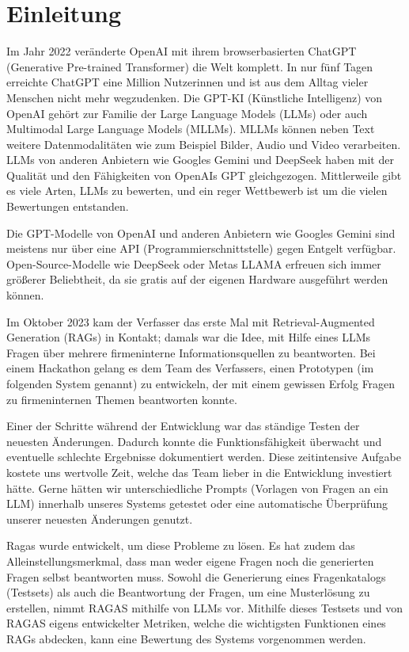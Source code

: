 \chapter{Einleitung}

Im Jahr 2022 veränderte OpenAI mit ihrem browserbasierten ChatGPT (Generative Pre-trained Transformer) \cite{openai_chatgpt_2022} die Welt komplett. In nur fünf Tagen erreichte ChatGPT eine Million Nutzer\*innen \cite{doit_software_chatgpt_2025} und ist aus dem Alltag vieler Menschen nicht mehr wegzudenken.
Die GPT-KI (Künstliche Intelligenz) von OpenAI gehört zur Familie der Large Language Models (LLMs) oder auch Multimodal Large Language Models (MLLMs). MLLMs können neben Text weitere Datenmodalitäten wie zum Beispiel Bilder, Audio und Video verarbeiten.
LLMs von anderen Anbietern wie Googles Gemini \cite{gemini_team_2023} und DeepSeek \cite{deepseek_team_2024} haben mit der Qualität und den Fähigkeiten von OpenAIs GPT gleichgezogen. Mittlerweile gibt es viele Arten, LLMs zu bewerten, und ein reger Wettbewerb ist um die vielen Bewertungen entstanden.

Die GPT-Modelle von OpenAI und anderen Anbietern wie Googles Gemini \cite{gemini_team_2024} sind meistens nur über eine API (Programmierschnittstelle) gegen Entgelt verfügbar.
Open-Source-Modelle wie DeepSeek \cite{deepseek_team_2024} oder Metas LLAMA \cite{touvron_2023} erfreuen sich immer größerer Beliebtheit, da sie gratis auf der eigenen Hardware ausgeführt werden können.

Im Oktober 2023 kam der Verfasser das erste Mal mit Retrieval-Augmented Generation (RAGs) in Kontakt; damals war die Idee, mit Hilfe eines LLMs Fragen über mehrere firmeninterne Informationsquellen zu beantworten.
Bei einem Hackathon gelang es dem Team des Verfassers, einen Prototypen (im folgenden System genannt) zu entwickeln, der mit einem gewissen Erfolg Fragen zu firmeninternen Themen beantworten konnte.

Einer der Schritte während der Entwicklung war das ständige Testen der neuesten Änderungen. Dadurch konnte die Funktionsfähigkeit überwacht und eventuelle schlechte Ergebnisse dokumentiert werden.
Diese zeitintensive Aufgabe kostete uns wertvolle Zeit, welche das Team lieber in die Entwicklung investiert hätte.
Gerne hätten wir unterschiedliche Prompts (Vorlagen von Fragen an ein LLM) innerhalb unseres Systems getestet oder eine automatische Überprüfung unserer neuesten Änderungen genutzt.

Ragas \cite{es_ragas_2024} wurde entwickelt, um diese Probleme zu lösen. Es hat zudem das Alleinstellungsmerkmal, dass man weder eigene Fragen noch die generierten Fragen selbst beantworten muss.
Sowohl die Generierung eines Fragenkatalogs (Testsets) als auch die Beantwortung der Fragen, um eine Musterlösung zu erstellen, nimmt RAGAS mithilfe von LLMs vor.
Mithilfe dieses Testsets und von RAGAS eigens entwickelter Metriken, welche die wichtigsten Funktionen eines RAGs abdecken, kann eine Bewertung des Systems vorgenommen werden.

